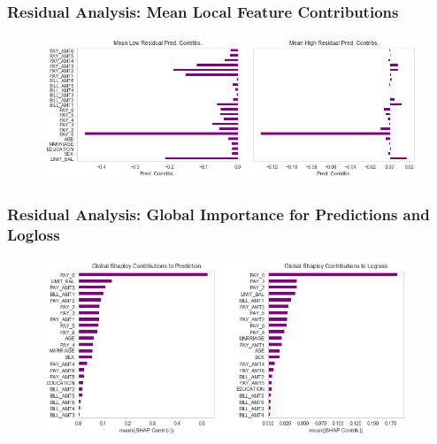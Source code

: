 \documentclass[11pt,
               aspectratio=43,
               hyperref={colorlinks}
               ]{beamer}
\begin{document}
			\begin{frame}
		
				\frametitle{\textbf{Residual Analysis}: Mean Local Feature Contributions}
		
				\begin{figure}[htb]
					\begin{center}
						\includegraphics[height=122pt]{img/global_high_low.png}
					\end{center}
				\end{figure}	
		
			\end{frame}

			\begin{frame}
		
				\frametitle{\textbf{Residual Analysis}: Global Importance for Predictions and Logloss}
		
				\begin{figure}[htb]
					\begin{center}
						\includegraphics[height=150pt]{img/global_pred_loss.png}
					\end{center}
				\end{figure}	
		
			\end{frame}
\end{document}

